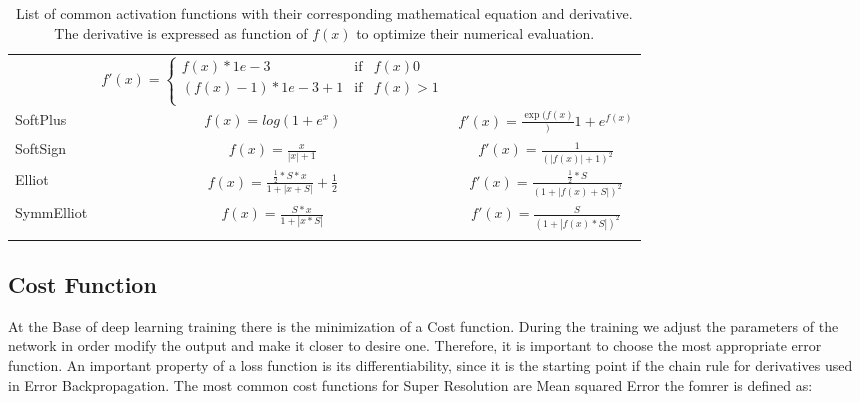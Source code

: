\documentclass[a4paper, 10pt]{book}
\begin{document}
\begin{table}[h]
\begin{adjustbox}{max width=\textwidth}
\begin{tabular}{lcc}
                                                    &  $f'(x) = \left\{\begin{array}{rlr}
                                                                        f(x) * 1e-3           & \mbox{if} & f(x) 0    \\
                                                                        (f(x) - 1) * 1e-3 + 1 & \mbox{if} & f(x) > 1  \\
                                                                        \end{array}\right.$                           \\

SoftPlus &  $f(x) = log(1 + e^{x})$                 &  $f'(x) = \frac{\exp(f(x)}){1 + e^{f(x)}}$ \\

SoftSign &  $f(x) = \frac{x}{|x| + 1}$              &  $f'(x) = \frac{1}{(|f(x)| + 1)^{2}}$ \\

Elliot   &  $f(x) = \frac{\frac{1}{2} * S * x}{1 + |x + S|} + \frac{1}{2}$

                                                    &  $f'(x) = \frac{\frac{1}{2} * S}{(1 + |f(x) + S|)^{2}} $ \\

SymmElliot &  $f(x) = \frac{S * x}{1 + |x * S|}$    &  $f'(x) = \frac{S}{(1 + |f(x) * S|)^{2}}$ \\





\hline\\
\end{tabular}
\end{adjustbox}
\caption{List of common activation functions with their corresponding mathematical equation and derivative.
The derivative is expressed as function of $f(x)$ to optimize their numerical evaluation.}
\end{table}

\subsection{Cost Function}

At the Base of deep learning training there is the minimization of a Cost function. During the training we adjust the parameters of the network in order modify the output and make it closer to desire one.
Therefore, it is important to choose the most appropriate error function. An important property of a loss function is its differentiability, since it is the starting point if the chain rule for derivatives used in Error Backpropagation.
The most common cost functions for Super Resolution are Mean squared Error
the fomrer is defined as:
\end{document}
